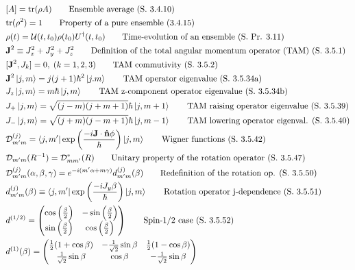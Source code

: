 \documentclass[10pt]{article}
\newcommand{\nhat}{\boldsymbol{\hat{\textbf{n}}}}
\newcommand{\ve}[1]{\boldsymbol{\mathbf{#1}}}
\newcommand{\lrp}[1]{\left( #1 \right)}
\newcommand{\herm}[1]{#1^\dagger}
\begin{document}
\begin{multicols}{2}
\begin{align*}
		& [A] = \text{tr}(\rho A)	\tag*{Ensemble average (S. 3.4.10)} \\
		& \text{tr}(\rho^2) = 1		\tag*{Property of a pure ensemble (3.4.15)} \\
		& \rho (t) = \mathcal{U}(t,t_0) \rho (t_0) \herm{U}(t,t_0)	\tag*{Time-evolution of an ensemble (S. Pr. 3.11)} \\
		& \ve{J}^2 \equiv J_x^2 +J_y^2 + J_z^2	\tag*{Definition of the total angular momentum operator (TAM) (S. 3.5.1)} \\
		& [\ve{J}^2, J_k] = 0, \; (k=1,2,3)		\tag*{TAM commutivity (S. 3.5.2)} \\
		& \ve{J}^2 \ket{j,m} = j(j+1)\hbar^2 \ket{j.m}	\tag*{TAM operator eigenvalue (S. 3.5.34a)} \\ 
		& J_z \ket{j,m} = m \hbar \ket{j,m}	\tag*{TAM z-component operator eigenvalue (S. 3.5.34b)} \\
		& J_+ \ket{j,m} = \sqrt{(j-m)(j+m+1)} \hbar \ket{j,m+1}		\tag*{TAM raising operator eigenvalue (S. 3.5.39)} \\
		& J_- \ket{j,m} = \sqrt{(j+m)(j-m+1)} \hbar \ket{j,m-1}	\tag*{TAM lowering operator eigenval. (S. 3.5.40)} \\
		& \mathcal{D}_{m'm}^{(j)} = \bra{j,m'} \exp \lrp{\frac{-i \ve{J} \cdot \nhat \phi}{\hbar}} \ket{j,m}	\tag*{Wigner functions (S. 3.5.42)} \\
		& \mathcal{D}_{m'm}(R^{-1}) = \mathcal{D}_{mm'}^*(R)	\tag*{Unitary property of the rotation operator (S. 3.5.47)} \\
		& \mathcal{D}_{m'm}^{(j)}(\alpha,\beta,\gamma) = e^{-i(m' \alpha + m \gamma)} d_{m'm}^{(j)}(\beta)	\tag*{Redefinition of the rotation op. (S. 3.5.50)} \\
		& d_{m'm}^{(j)}(\beta) \equiv \bra{j,m'} \exp\lrp{\frac{-iJ_y \beta}{\hbar}} \ket{j,m}	\tag*{Rotation operator j-dependence (S. 3.5.51)} \\
		& d^{(1/2)} = \begin{pmatrix}
			\cos \lrp{\frac{\beta}{2}} & -\sin \lrp{\frac{\beta}{2}} \\
			\sin \lrp{\frac{\beta}{2}} & \cos \lrp{\frac{\beta}{2}} \\
		\end{pmatrix}	\tag*{Spin-1/2 case (S. 3.5.52)} \\
		& d^{(1)}(\beta) = \begin{pmatrix}
			\frac{1}{2}(1+\cos \beta) & -\frac{1}{\sqrt{2}} \sin \beta & \frac{1}{2}(1 - \cos \beta) \\
			\frac{1}{\sqrt{2}} \sin \beta& \cos \beta & -\frac{1}{\sqrt{2}} \sin \beta \\

\end{pmatrix}
\end{align*}
\end{multicols}
\end{document}
